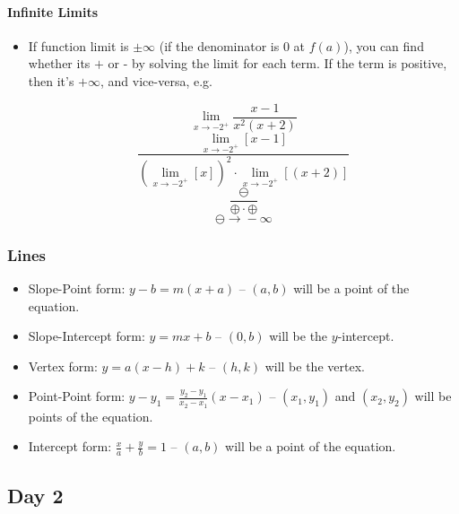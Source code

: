 \documentclass[12pt]{article}
\def\Plus{\texttt{+}}
\def\Minus{\texttt{-}}
\begin{document}
\paragraph{Infinite Limits}
\begin{itemize}
    \item If function limit is $\pm \infty$ (if the denominator is 0 at $f(a)$), you can find whether its $\Plus{}$ or $\Minus{}$ by solving the limit for each term. If the term is positive, then it's $+ \infty$, and vice-versa, e.g.
    
    $$\lim_{x \to -2^+} \frac{x-1}{x^2(x+2)}$$
    $$\frac{\lim_{x \to -2^+} [x-1]}{ (\lim_{x \to -2^+} [x])^2 \cdot \lim_{x \to -2^+} [(x+2)]}$$
    $$\frac{\ominus}{\oplus \cdot \oplus}$$
    $$\ominus \rightarrow{} -\infty$$

\end{itemize}

\subsubsection{Lines}
\begin{itemize}
    \item Slope-Point form: $y-b = m(x+a)$ -- $(a,b)$ will be a point of the equation.
    \item Slope-Intercept form: $y = mx + b$ -- $(0,b)$ will be the $y$-intercept.
    \item Vertex form: $y = a(x-h)+k$ -- $(h,k)$ will be the vertex.
    \item Point-Point form: $y-y_1=\frac{y_2-y_1}{x_2-x_1}(x-x_1)$ -- $(x_1,y_1)$ and $(x_2,y_2)$ will be points of the equation.
    \item Intercept form:  $\frac{x}{a} + \frac{y}{b} = 1$  -- $(a, b)$ will be a point of the equation.
    
\end{itemize}

\subsection{Day 2}
\end{document}
